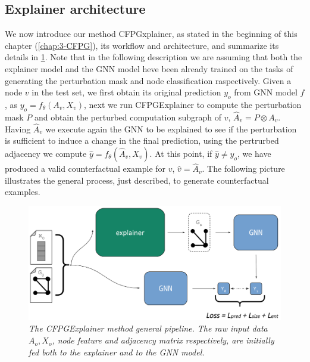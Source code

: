 \documentclass[binding=0.6cm]{sapthesis}
\begin{document}
\subsection{Explainer architecture}
\label{sec:cfpg.my.model}
We now introduce our method CFPGxplainer, as stated in the beginning of this chapter (\cref{chap:3-CFPG}), its workflow and architecture, and summarize its details in \cref{fig:cfpg.my.cfpg-model}. Note that in the following description we are assuming that both the explainer model and the GNN model heve been already trained on the tasks of generating the perturbation mask and node classification raspectively. 
Given a node $v$ in the test set, we first obtain its original prediction $y_o$ from GNN model $f$, as $y_o = f_{\theta}(A_v,X_v)$, next we run CFPGExplainer to compute the perturbation mask $P$ and obtain the perturbed computation subgraph of $v$, $\hat{A}_v = P \otimes A_v$. 
Having $\hat{A}_v$ we execute again the GNN to be explained to see if the perturbation is sufficient to induce a change in the final prediction, using the pertrurbed adjacency we compute $\hat{y} = f_{\theta}(\hat{A}_v,X_v)$. At this point, if $\hat{y} \ne y_o$, we have produced a valid counterfactual example for $v$, $\hat{v} = \hat{A}_v$. The following picture illustrates the general process, just described, to generate counterfactual examples. 
\bigskip
\begin{figure}[h]
    \centering
    \includegraphics[width=\textwidth]{imgs/cfpg/cfpg-general-02.png}
    \caption{\textit{The CFPGExplainer method general pipeline. The raw input data $A_o,X_o$, node feature and adjacency matrix respectively, are initially fed both to the explainer and to the GNN model.}}
    \label{fig:cfpg.my.cfpg-model}
\end{figure}
\end{document}
